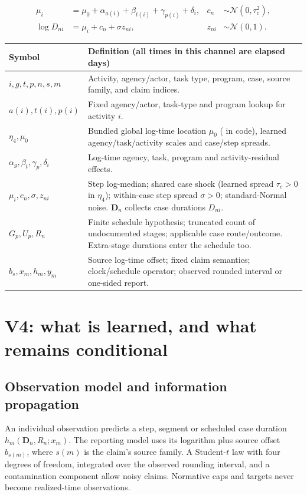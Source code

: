 \documentclass[10pt]{article}
\newcommand{\code}[1]{\texttt{\small\detokenize{#1}}}
\newcommand{\Normal}{\mathcal N}
\begin{document}
\vspace{-.5em}
\[
\begin{aligned}
 \mu_i&=\mu_0+\alpha_{a(i)}+\beta_{t(i)}+\gamma_{p(i)}+\delta_i,
 &c_n&\sim\Normal(0,\tau_c^2),\\
 \log D_{ni}&=\mu_i+c_n+\sigma z_{ni},
 &z_{ni}&\sim\Normal(0,1).
\end{aligned}
\]
\par\vspace{-.8em}
{\small\noindent%
\begin{tabularx}{\linewidth}{@{}p{.23\linewidth}Y@{}}
\toprule Symbol & Definition (all times in this channel are elapsed days) \\
\midrule
$i,g,t,p,n,s,m$ & Activity, agency/actor, task type, program, case, source family, and claim indices. \\
$a(i),t(i),p(i)$ & Fixed agency/actor, task-type and program lookup for activity $i$. \\
$\eta_4,\mu_0$ & Bundled global log-time location $\mu_0$ (\code{m} in code), learned agency/task/activity scales and case/step spreads. \\
$\alpha_g,\beta_t,\gamma_p,\delta_i$ & Log-time agency, task, program and activity-residual effects. \\
$\mu_i,c_n,\sigma,z_{ni}$ & Step log-median; shared case shock (learned spread $\tau_c>0$ in $\eta_4$); within-case step spread $\sigma>0$; standard-Normal noise. $\mathbf D_n$ collects case durations $D_{ni}$. \\
$G_p,U_p,R_n$ & Finite schedule hypothesis; truncated count of undocumented stages; applicable case route/outcome. Extra-stage durations enter the schedule too. \\
$b_s,x_m,h_m,y_m$ & Source log-time offset; fixed claim semantics; clock/schedule operator; observed rounded interval or one-sided report. \\
\bottomrule
\end{tabularx}}

\clearpage
\section{V4: what is learned, and what remains conditional}
\subsection*{Observation model and information propagation}
An individual observation predicts a step, segment or scheduled case duration
$h_m(\mathbf D_n,R_n;x_m)$. The reporting model uses its logarithm plus source
offset $b_{s(m)}$, where $s(m)$ is the claim's source family. A Student-$t$ law with
four degrees of freedom, integrated over the observed rounding interval, and a
contamination component allow noisy claims. Normative caps and targets never
become realized-time observations.
\end{document}
